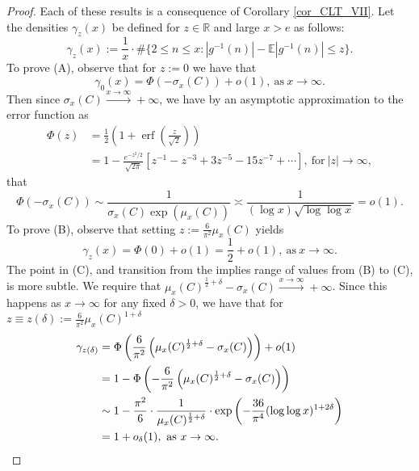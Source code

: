 \documentclass[11pt,reqno,a4letter]{article}
\numberwithin{figure}{section}
\numberwithin{table}{section}
\theoremstyle{plain}
\numberwithin{theorem}{section}
\theoremstyle{definition}
\begin{document}
\begin{proof} 
Each of these results is a consequence of Corollary \ref{cor_CLT_VII}. 
Let the densities $\gamma_z(x)$ be defined for $z \in \mathbb{R}$ and 
large $x > e$ as follows: 
\[
\gamma_z(x) := \frac{1}{x} \cdot \#\{2 \leq n \leq x: |g^{-1}(n)| - \mathbb{E}|g^{-1}(n)| \leq z\}. 
\]
To prove (A), observe that for $z := 0$ we have that 
\[
\gamma_0(x) = \Phi\left(-\sigma_x(C)\right) + o(1), \mathrm{\ as\ } x \rightarrow \infty. 
\]
Then since $\sigma_x(C) \xrightarrow{x \rightarrow \infty} +\infty$, we have by an asymptotic approximation 
to the error function as 
\begin{align*} 
\Phi(z) & = \frac{1}{2}\left(1 + \operatorname{erf}\left(\frac{z}{\sqrt{2}}\right)\right) \\ 
     & = 1 - \frac{e^{-z^2/2}}{\sqrt{2\pi}}\left[ 
     z^{-1} - z^{-3} + 3z^{-5} - 15z^{-7} + \cdots 
     \right], \mathrm{\ for\ } |z| \rightarrow \infty, 
\end{align*} 
that 
\[
\Phi\left(-\sigma_x(C)\right) \sim \frac{1}{\sigma_x(C) \exp(\mu_x(C))} \asymp 
     \frac{1}{(\log x) \sqrt{\log\log x}} = o(1). 
\]
To prove (B), observe that setting $z := \frac{6}{\pi^2} \mu_x(C)$ yields 
\[
\gamma_z(x) = \Phi(0) + o(1) = \frac{1}{2} + o(1), \mathrm{\ as\ } x \rightarrow \infty. 
\]
The point in (C), and transition from the implies range of values from (B) to (C), is more subtle. 
We require that $\mu_x(C)^{\frac{1}{2} + \delta} - \sigma_x(C) \xrightarrow{x \rightarrow \infty} +\infty$. 
Since this happens as $x \rightarrow \infty$ for any fixed $\delta > 0$, we have that 
for $z \equiv z(\delta) := \frac{6}{\pi^2} \mu_x(C)^{1 + \delta}$ 
\begin{align*} 
\gamma_{z(\delta)} & = \Phi\left(\frac{6}{\pi^2}\left(\mu_x(C)^{\frac{1}{2} + \delta} - \sigma_x(C)\right)\right) + o(1) \\ 
     & = 1 - \Phi\left(-\frac{6}{\pi^2}\left(\mu_x(C)^{\frac{1}{2} + \delta} - \sigma_x(C)\right)\right) \\ 
     & \sim 1 - \frac{\pi^2}{6} \cdot \frac{1}{\mu_x(C)^{\frac{1}{2} + \delta}} \cdot 
     \exp\left(-\frac{36}{\pi^4} (\log\log x)^{1+2\delta}\right) \\ 
     & = 1 + o_{\delta}(1), \mathrm{\ as\ } x \rightarrow \infty. 
     \qedhere 
\end{align*} 
\end{proof} 
\end{document}
